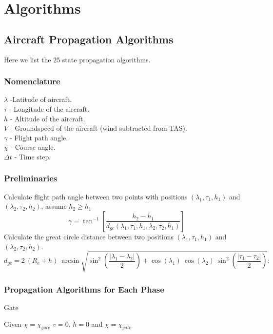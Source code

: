 \documentclass[11pt]{book}              %
\begin{document}
\chapter{Algorithms}
\section{Aircraft Propagation Algorithms}
Here we list the 25 state propagation algorithms. 
\subsection{Nomenclature}
$\lambda$ -Latitude of aircraft.\\
$\tau$ - Longitude of the aircraft.\\ 
$h$ - Altitude of the aircraft.\\
$V$ - Groundspeed of the aircraft (wind subtracted from TAS).\\
$\gamma$ - Flight path angle.\\
$\chi$ - Course angle.\\
$\Delta t$ - Time step.\\
\subsection{Preliminaries}
Calculate flight path angle between two points with positions $(\lambda_1, \tau_1, h_1)$ and $(\lambda_2, \tau_2, h_2)$, assume $h_2 \geq h_1$
\begin{equation}
\gamma = \tan^{-1}\left[\frac{h_2-h_1}{d_{gc}(\lambda_1,\tau_1,h_1, \lambda_2,\tau_2,h_1)}\right]
\label{eqn:algoeqn1}
\end{equation}
Calculate the great circle distance between two positions $(\lambda_1, \tau_1, h_1)$ and $(\lambda_2, \tau_2, h_2)$.
\begin{equation}
d_{gc} = 2\:(R_e + h)\: \arcsin{\sqrt{\sin^2\left(\frac{|\lambda_1-\lambda_2|}{2}\right) + \cos(\lambda_1)\:\cos(\lambda_2)\:\sin^2\left(\frac{|\tau_1-\tau_2|}{2}\right)}};
\label{eqn:algoeqn2}
\end{equation}
\subsection{Propagation Algorithms for Each Phase}
\begin{algorithm}[H]
\caption{Gate}\label{alg:PropAlgo1}
\begin{algorithmic}[1]
\State Given $\chi = \chi_{gate}$
\State $v=0$, $\dot{h} = 0$ and $\chi = \chi_{gate}$
\EndIf
\end{algorithmic}
\end{algorithm}
\end{document}
